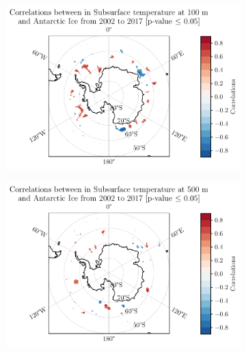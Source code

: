 \documentclass[../main.tex]{subfiles}
\begin{document}
\begin{figure}[hbt!]
    \centering
    \begin{subfigure}[b]{0.45\textwidth}
    \includegraphics[width=\textwidth]{images/2021w5/chapter7/hres/correlation_spatial_subsurtemp_100}
    \end{subfigure}
    \begin{subfigure}[b]{0.45\textwidth}
    \includegraphics[width=\textwidth]{images/2021w5/chapter7/hres/correlation_spatial_subsurtemp_500}
    \end{subfigure}
    \begin{subfigure}[b]{0.45\textwidth}

\end{subfigure}
\end{figure}
\end{document}
